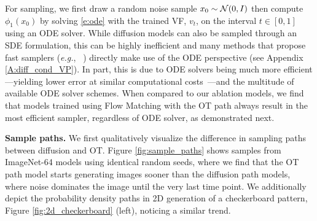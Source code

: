 \documentclass{article}
\makeatletter
\renewcommand*{\eg}{{\it e.g.}\@\xspace}
\makeatother
\begin{document}
For sampling, we first draw a random noise sample $x_0 \sim {\mathcal{N}}(0,I)$ then compute $\phi_1(x_0)$ by solving \eqref{e:ode} with the trained VF, $v_t$, on the interval $t\in [0, 1]$ using an ODE solver. While diffusion models can also be sampled through an SDE formulation, this can be highly inefficient and many methods that propose fast samplers (\eg, ~\citet{song2020denoising,zhang2022fast}) directly make use of the ODE perspective (see Appendix \ref{A:diff_cond_VP}). 
In part, this is due to ODE solvers being much more efficient---yielding lower error at similar computational costs~\citep{kloeden2012numerical}---and the multitude of available ODE solver schemes. 
When compared to our ablation models, we find that models trained using Flow Matching with the OT path always result in the most efficient sampler, regardless of ODE solver, as demonstrated next. 

\textbf{Sample paths.} We first qualitatively visualize the difference in sampling paths between diffusion and OT. Figure \ref{fig:sample_paths} shows samples from ImageNet-64 models using identical random seeds, where we find that the OT path model starts generating images sooner than the diffusion path models, where noise dominates the image until the very last time point.
We additionally depict the probability density paths in 2D generation of a checkerboard pattern, Figure \ref{fig:2d_checkerboard} (left), noticing a similar trend.
\end{document}
